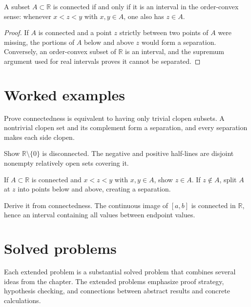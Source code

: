 \begin{theorem}\label{thm:ii07-04}
A subset $A\subset\mathbb R$ is connected if and only if it is an interval in the order-convex sense: whenever $x<z<y$ with $x,y\in A$, one also has $z\in A$.
\begin{proof}
If $A$ is connected and a point $z$ strictly between two points of $A$ were missing, the portions of $A$ below and above $z$ would form a separation. Conversely, an order-convex subset of $\mathbb R$ is an interval, and the supremum argument used for real intervals proves it cannot be separated.
\end{proof}
\end{theorem}

\section{Worked examples}

\begin{example}\label{ex:ii07-worked-01}
Prove connectedness is equivalent to having only trivial clopen subsets. A nontrivial clopen set and its complement form a separation, and every separation makes each side clopen.
\end{example}

\begin{example}\label{ex:ii07-worked-02}
Show $\mathbb R\setminus\{0\}$ is disconnected. The negative and positive half-lines are disjoint nonempty relatively open sets covering it.
\end{example}

\begin{example}\label{ex:ii07-worked-03}
If $A\subset\mathbb R$ is connected and $x<z<y$ with $x,y\in A$, show $z\in A$. If $z\notin A$, split $A$ at $z$ into points below and above, creating a separation.
\end{example}

\begin{example}\label{ex:ii07-worked-04}
Derive it from connectedness. The continuous image of $[a,b]$ is connected in $\mathbb R$, hence an interval containing all values between endpoint values.
\end{example}

\section{Solved problems}
Each extended problem is a substantial solved problem that combines several ideas from the chapter. The extended problems emphasize proof strategy, hypothesis checking, and connections between abstract results and concrete calculations.

